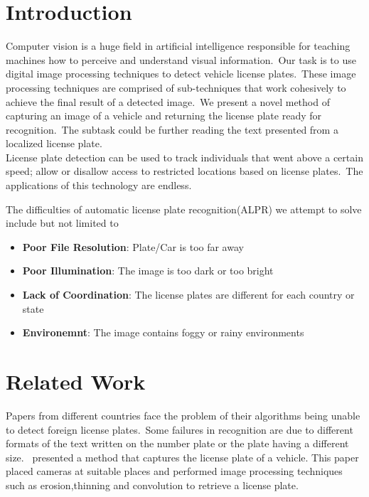 \documentclass[a4paper,twoside,10pt]{report}
\begin{document}
\chapter{Introduction}
Computer vision is a huge field in artificial intelligence responsible for teaching machines how to perceive and understand visual information.\
Our task is to use digital image processing techniques to detect vehicle license plates.\ 
These image processing techniques are comprised of sub-techniques that work cohesively to achieve the final result of a detected image.\ 
We present a novel method of capturing an image of a vehicle and returning the license plate ready for recognition.\ 
The subtask could be further reading the text presented from a localized license plate. \\ [4pt]

License plate detection can be used to track individuals that went above a certain speed;  allow or disallow access to restricted locations based on license plates.\ 
The applications of this technology are endless.

The difficulties of automatic license plate recognition(ALPR) we attempt to solve include but not limited to 
\begin{itemize}
  \item \textbf{Poor File Resolution}: Plate/Car is too far away
  \item \textbf{Poor Illumination}: The image is too dark or too bright 
  \item \textbf{Lack of Coordination}: The license plates are different for each country or state 
  \item \textbf{Environemnt}: The image contains foggy or rainy environments
\end{itemize}

\chapter{Related Work}
Papers from different countries face the problem of their algorithms being unable to detect foreign license plates.\ 
Some failures in recognition are due to different formats of the text written on the number plate or the plate having a different size.\ 
\citet*{redmon2016look} presented a method that captures the license plate of a vehicle. This paper placed cameras at suitable places and performed image processing techniques such as erosion,thinning and convolution to retrieve a license plate. \\ [4pt]
\end{document}
